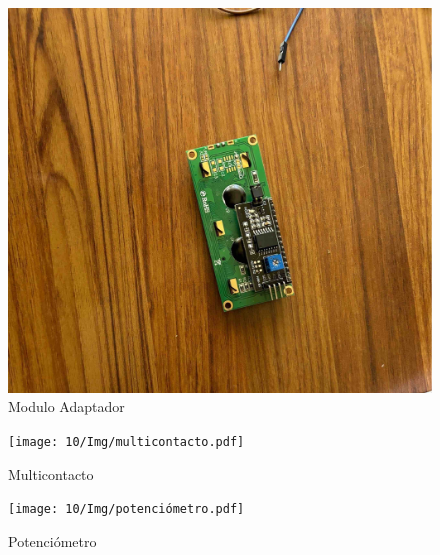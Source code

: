     \begin{figure}[H]
        \centering
        \includegraphics[trim = {30mm 30mm 30mm 30mm},clip,scale=0.2]{10/Img/moduloAdaptador.pdf}
        \caption{Modulo Adaptador}
        \label{Adaptador}
    \end{figure}
    
    \begin{figure}[H]
        \centering
        \texttt{[image: 10/Img/multicontacto.pdf]}
        \caption{Multicontacto}
        \label{Multicontacto}
    \end{figure}
    
    \begin{figure}[H]
        \centering
        \texttt{[image: 10/Img/potenciómetro.pdf]}
        \caption{Potenciómetro}
        \label{Potenciómetro}
    \end{figure}
    
